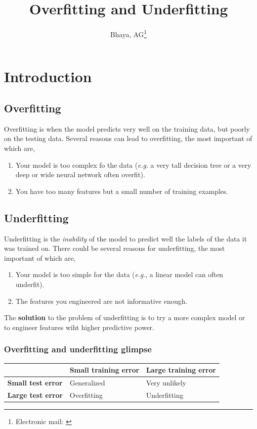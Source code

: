 \documentclass{scrartcl}
\title{\textbf{Overfitting and Underfitting}}
\author{Bhaya, AG\thanks{\faEnvelope[regular] Electronic mail: \href{mailto:contact@angubh.io}{\code{ananya[dot]gb[at]nbu[dot]ac[dot]in}}}}
\newcounter{prob}
\begin{document}
	\maketitle
	\pagebreak
	\tableofcontents
	\pagebreak
	
	\section{Introduction}
	\subsection{Overfitting}
	Overfitting is when the model predicts very well on the training data, but poorly on the testing data. Several reasons can lead to overfitting, the most important of which are,
	
	\begin{enumerate}[label*=\Roman*.]
		\item Your model is too complex fo the data (\textit{e.g.} a very tall decision tree or a very deep or wide neural network often overfit).
		\item You have too many features but a small number of training examples.
	\end{enumerate}
	
	\subsection{Underfitting}
	Underfitting is the \textit{inability} of the model to predict well the labels of the data it was trained on. There could be several reasons for underfitting, the most important of which are,
	
	\begin{enumerate}[label*=\Roman*.]
		\item Your model is too simple for the data (\textit{e.g.}, a linear model can often underfit).
		\item The features you engineered are not informative enough.
	\end{enumerate}
	
	The \textbf{solution} to the problem of underfitting is to try a more complex model or to engineer features wiht higher predictive power.
	
	\subsubsection*{Overfitting and underfitting glimpse}
	\begin{table}[ht]
		\centering
		\begin{tabularx}{0.7\textwidth}{|X|X|X|}
			\hline
			& \textbf{Small training error} & \textbf{Large training error}\\ 
			\hline
			\textbf{Small test error} & Generalized & Very unlikely\\ \hline
			\textbf{Large test error} & Overfitting & Underfitting\\ \hline
		\end{tabularx}
	\end{table}
	
\end{document}
